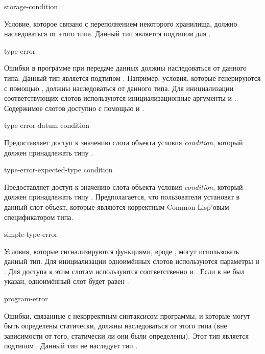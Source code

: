 \begin{defun}[Тип]
storage-condition

Условие, которое связано с переполнением некоторого хранилища, должно
наследоваться от этого типа. Данный тип является подтипом для .
\end{defun}

\begin{defun}[Тип]
type-error

Ошибки в программе при передаче данных должны наследоваться от данного
типа. Данный тип является подтипом . Например, условия, которые
генерируются с помощью , должны наследоваться  от данного
типа. Для инициализации соответствующих слотов используются инициализационные
аргументы  и . Содержимое слотов доступно с
помощью  и
.
\end{defun}

\begin{defun}[Функция]
type-error-datum condition

Предоставляет доступ к значению слота  объекта условия
\emph{condition}, который должен принадлежать типу .
\end{defun}

\begin{defun}[Функция]
type-error-expected-type condition

Предоставляет доступ к значению слота  объекта условия
\emph{condition}, который должен принадлежать типу
. Предполагается, что пользователи  установят
в данный слот объект, которые являются корректным Common Lisp'овым
спецификатором типа.
\end{defun}

\begin{defun}[Тип]
simple-type-error

Условия, которые сигнализируются функциями, вроде , могут
использовать данный тип. Для инициализации одноимённых слотов используются
параметры  и . Для доступа к этим
слотам используются соответственно  и
. Если в 
 не был указан, одноимённый слот будет равен .
\end{defun}

\begin{defun}[Тип]
program-error

Ошибки, связанные с некорректным синтаксисом программы, и которые могут быть
определены статически, должны наследоваться от этого типа (вне зависимости от
того, статически ли они были определены). Этот тип является подтипом
. Данный тип не наследует тип .
\end{defun}

